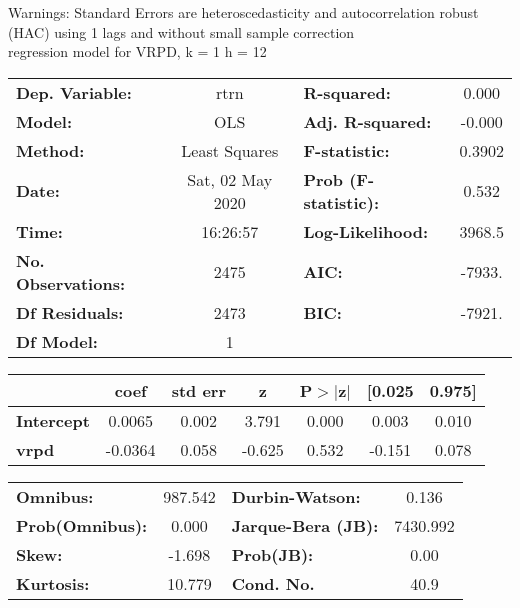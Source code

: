 Warnings: \newline
 [1] Standard Errors are heteroscedasticity and autocorrelation robust (HAC) using 1 lags and without small sample correction\\ 

regression model for VRPD, k = 1 h = 12\begin{center}
\begin{tabular}{lclc}
\toprule
\textbf{Dep. Variable:}    &       rtrn       & \textbf{  R-squared:         } &     0.000   \\
\textbf{Model:}            &       OLS        & \textbf{  Adj. R-squared:    } &    -0.000   \\
\textbf{Method:}           &  Least Squares   & \textbf{  F-statistic:       } &    0.3902   \\
\textbf{Date:}             & Sat, 02 May 2020 & \textbf{  Prob (F-statistic):} &    0.532    \\
\textbf{Time:}             &     16:26:57     & \textbf{  Log-Likelihood:    } &    3968.5   \\
\textbf{No. Observations:} &        2475      & \textbf{  AIC:               } &    -7933.   \\
\textbf{Df Residuals:}     &        2473      & \textbf{  BIC:               } &    -7921.   \\
\textbf{Df Model:}         &           1      & \textbf{                     } &             \\
\bottomrule
\end{tabular}
\begin{tabular}{lcccccc}
                   & \textbf{coef} & \textbf{std err} & \textbf{z} & \textbf{P$> |$z$|$} & \textbf{[0.025} & \textbf{0.975]}  \\
\midrule
\textbf{Intercept} &       0.0065  &        0.002     &     3.791  &         0.000        &        0.003    &        0.010     \\
\textbf{vrpd}      &      -0.0364  &        0.058     &    -0.625  &         0.532        &       -0.151    &        0.078     \\
\bottomrule
\end{tabular}
\begin{tabular}{lclc}
\textbf{Omnibus:}       & 987.542 & \textbf{  Durbin-Watson:     } &    0.136  \\
\textbf{Prob(Omnibus):} &   0.000 & \textbf{  Jarque-Bera (JB):  } & 7430.992  \\
\textbf{Skew:}          &  -1.698 & \textbf{  Prob(JB):          } &     0.00  \\
\textbf{Kurtosis:}      &  10.779 & \textbf{  Cond. No.          } &     40.9  \\
\bottomrule
\end{tabular}
\end{center}

